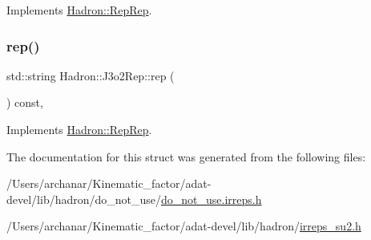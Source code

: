 Implements \mbox{\hyperlink{structHadron_1_1RepRep_ab3213025f6de249f7095892109575fde}{Hadron\+::\+Rep\+Rep}}.

\mbox{\label{structHadron_1_1J3o2Rep_a4284616b9bdc9582f085ab1b60a15f1d}} 
\subsubsection{\texorpdfstring{rep()}{rep()}\hspace{0.1cm}{\footnotesize\ttfamily [5/5]}}
{\footnotesize\ttfamily std\+::string Hadron\+::\+J3o2\+Rep\+::rep (\begin{DoxyParamCaption}{ }\end{DoxyParamCaption}) const\hspace{0.3cm}{\ttfamily [inline]}, {\ttfamily [virtual]}}



Implements \mbox{\hyperlink{structHadron_1_1RepRep_ab3213025f6de249f7095892109575fde}{Hadron\+::\+Rep\+Rep}}.



The documentation for this struct was generated from the following files\+:\begin{DoxyCompactItemize}
\item 
/\+Users/archanar/\+Kinematic\+\_\+factor/adat-\/devel/lib/hadron/do\+\_\+not\+\_\+use/\mbox{\hyperlink{adat-devel_2lib_2hadron_2do__not__use_2do__not__use_8irreps_8h}{do\+\_\+not\+\_\+use.\+irreps.\+h}}\item 
/\+Users/archanar/\+Kinematic\+\_\+factor/adat-\/devel/lib/hadron/\mbox{\hyperlink{adat-devel_2lib_2hadron_2irreps__su2_8h}{irreps\+\_\+su2.\+h}}\end{DoxyCompactItemize}
